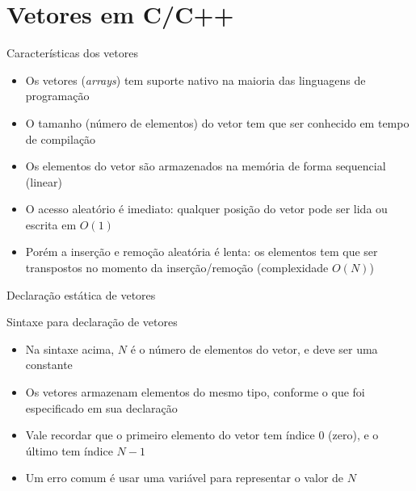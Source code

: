\section{Vetores em C/C++}

\begin{frame}[fragile]{Características dos vetores}

	\begin{itemize}
		\item Os vetores (\textit{arrays}) tem suporte nativo na maioria das linguagens de 
        programação

		\item O tamanho (número de elementos) do vetor tem que ser conhecido em tempo de compilação

		\item Os elementos do vetor são armazenados na memória de forma sequencial (linear)

		\item O acesso aleatório é imediato: qualquer posição do vetor pode ser lida ou escrita
		em $O(1)$

		\item Porém a inserção e remoção aleatória é lenta: os elementos tem que ser transpostos no         momento da inserção/remoção (complexidade $O(N)$)
	\end{itemize}

\end{frame} 

\begin{frame}[fragile]{Declaração estática de vetores}

    \begin{block}{Sintaxe para declaração de vetores}
    \end{block}

	\begin{itemize}
		\item Na sintaxe acima, $N$ é o número de elementos do vetor, e deve ser 
        uma constante

		\item Os vetores armazenam elementos do mesmo tipo, conforme o que foi especificado em sua 
        declaração

        \item Vale recordar que o primeiro elemento do vetor tem índice 0 (zero), e o último tem
        índice $N - 1$

        \item Um erro comum é usar uma variável para representar o valor de $N$
	\end{itemize}

\end{frame}

